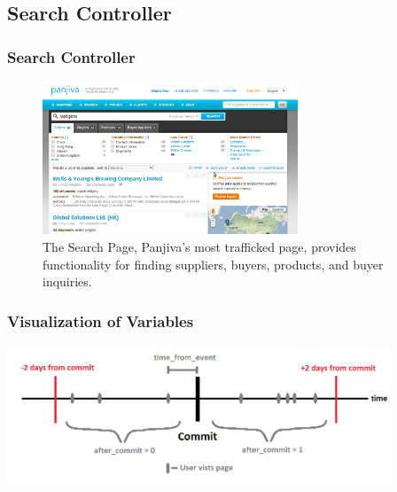 \documentclass[xcolor=pdftex,dvipsnames,table]{beamer}
\begin{document}
\subsection{Search Controller}

\frame{\tableofcontents[currentsubsection]}

\frame
{
    \frametitle{Search Controller}
    \begin{figure}
    \centering
    \includegraphics[width=3in]{pictures/search_page.png}
    \caption{The Search Page, Panjiva's most trafficked page, provides functionality for finding suppliers, buyers, products, and buyer inquiries.}
    \end{figure}
}

\frame
{
    \frametitle{Visualization of Variables}
    \includegraphics[width=4.5in]{pictures/specification_diagram.png}

}
\end{document}
